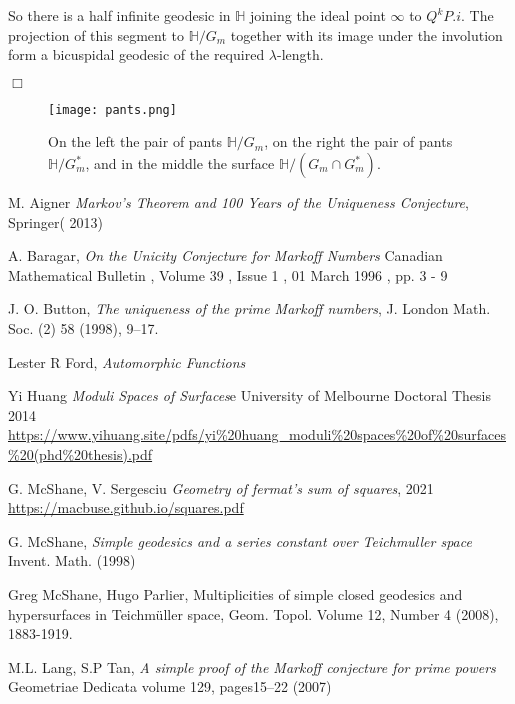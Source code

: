 \documentclass[12pt,a4paper]{amsart}
\def\HH{\mathbb{H}}
\def\GG{G_m}
\begin{document}
So there is a half infinite geodesic in $\HH$ joining the ideal point $\infty$
to $Q^kP.i$. The projection of this segment to $\HH/\GG$ together with its image
under the involution form a bicuspidal geodesic of the required
$\lambda$-length.

\hfill$\Box$


\begin{figure}[ht]
\begin{center}
\texttt{[image: pants.png]}
\end{center}
\caption{On the left the pair of pants $\HH/\GG$,
	on the right  the pair of pants $\HH/\GG^*$,
and in the middle the surface $\HH/(\GG\cap \GG^*)$.}
\label{fig: pants}
\end{figure}


M. Aigner
\textit{Markov's Theorem and 100 Years of the Uniqueness Conjecture}, Springer( 2013)


A. Baragar,
\textit{On the Unicity Conjecture for Markoff Numbers}
Canadian Mathematical Bulletin , Volume 39 , Issue 1 , 01 March 1996 , pp. 3 - 9

J. O. Button, 
\textit{The uniqueness of the prime Markoff numbers},
 J. London Math. Soc.
(2) 58 (1998), 9–17.



Lester R Ford,
\textit{Automorphic Functions}

Yi Huang
\textit{Moduli Spaces of Surfaces}e University of Melbourne Doctoral Thesis 2014
\url{https://www.yihuang.site/pdfs/yi%20huang_moduli%20spaces%20of%20surfaces%20(phd%20thesis).pdf}

G. McShane, V. Sergesciu
\textit{Geometry of fermat’s sum of squares}, 2021 
\url{https://macbuse.github.io/squares.pdf}

G. McShane,
\textit{Simple geodesics and a series constant over Teichmuller space}
Invent. Math. (1998)

Greg McShane, Hugo Parlier,
Multiplicities of simple closed geodesics and hypersurfaces in Teichmüller space,
Geom. Topol.
Volume 12, Number 4 (2008), 1883-1919.

M.L. Lang, S.P Tan,
\textit{A simple proof of the Markoff conjecture for prime powers}
Geometriae Dedicata volume 129, pages15–22 (2007)
\end{document}
